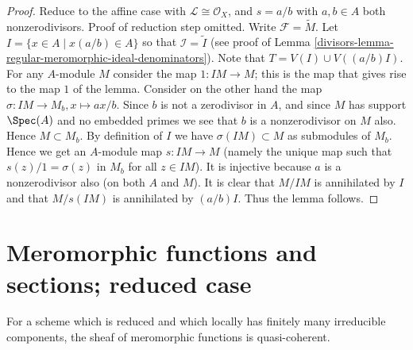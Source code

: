 \begin{proof}

Reduce to the affine case with $\mathcal{L} \cong \mathcal{O}_X$,
and $s = a/b$ with $a, b \in A$ both nonzerodivisors.
Proof of reduction step omitted.
Write $\mathcal{F} = \widetilde{M}$.
Let $I = \{x \in A \mid x(a/b) \in A\}$
so that $\mathcal{I} = \widetilde{I}$ (see
proof of Lemma \ref{divisors-lemma-regular-meromorphic-ideal-denominators}).
Note that $T = V(I) \cup V((a/b)I)$.
For any $A$-module $M$ consider the map $1 : IM \to M$; this is the
map that gives rise to the map $1$ of the lemma.
Consider on the other hand the map
$\sigma : IM \to M_b, x \mapsto ax/b$.
Since $b$ is not a zerodivisor in $A$, and since
$M$ has support $\Spec(A)$ and no embedded primes we
see that $b$ is a nonzerodivisor on $M$ also. Hence $M \subset M_b$.
By definition of $I$ we have $\sigma(IM) \subset M$ as submodules
of $M_b$. Hence we get an $A$-module map $s : IM \to M$ (namely the
unique map such that $s(z)/1 = \sigma(z)$ in $M_b$ for all $z \in IM$).
It is injective because $a$ is a nonzerodivisor also (on both $A$ and $M$).
It is clear that $M/IM$ is annihilated by $I$ and that
$M/s(IM)$ is annihilated by $(a/b)I$. Thus the lemma follows.
\end{proof}

\section{Meromorphic functions and sections; reduced case}
\label{divisors-section-meromorphic-reduced}
For a scheme which is reduced and which locally has finitely many irreducible
components, the sheaf of meromorphic functions is quasi-coherent.

